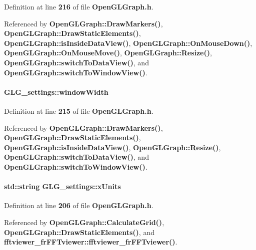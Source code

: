 Definition at line {\bf 216} of file {\bf Open\+G\+L\+Graph.\+h}.



Referenced by {\bf Open\+G\+L\+Graph\+::\+Draw\+Markers()}, {\bf Open\+G\+L\+Graph\+::\+Draw\+Static\+Elements()}, {\bf Open\+G\+L\+Graph\+::is\+Inside\+Data\+View()}, {\bf Open\+G\+L\+Graph\+::\+On\+Mouse\+Down()}, {\bf Open\+G\+L\+Graph\+::\+On\+Mouse\+Move()}, {\bf Open\+G\+L\+Graph\+::\+Resize()}, {\bf Open\+G\+L\+Graph\+::switch\+To\+Data\+View()}, and {\bf Open\+G\+L\+Graph\+::switch\+To\+Window\+View()}.

\paragraph[{window\+Width}]{ G\+L\+G\+\_\+settings\+::window\+Width}\label{structGLG__settings_aaa623853a072110c5f973ae6faff844b}


Definition at line {\bf 215} of file {\bf Open\+G\+L\+Graph.\+h}.



Referenced by {\bf Open\+G\+L\+Graph\+::\+Draw\+Markers()}, {\bf Open\+G\+L\+Graph\+::\+Draw\+Static\+Elements()}, {\bf Open\+G\+L\+Graph\+::is\+Inside\+Data\+View()}, {\bf Open\+G\+L\+Graph\+::\+Resize()}, {\bf Open\+G\+L\+Graph\+::switch\+To\+Data\+View()}, and {\bf Open\+G\+L\+Graph\+::switch\+To\+Window\+View()}.

\paragraph[{x\+Units}]{\setlength{\rightskip}{0pt plus 5cm}std\+::string G\+L\+G\+\_\+settings\+::x\+Units}\label{structGLG__settings_a9e977401fcf81ec809d544428054c4e3}


Definition at line {\bf 206} of file {\bf Open\+G\+L\+Graph.\+h}.



Referenced by {\bf Open\+G\+L\+Graph\+::\+Calculate\+Grid()}, {\bf Open\+G\+L\+Graph\+::\+Draw\+Static\+Elements()}, and {\bf fftviewer\+\_\+fr\+F\+F\+Tviewer\+::fftviewer\+\_\+fr\+F\+F\+Tviewer()}.

